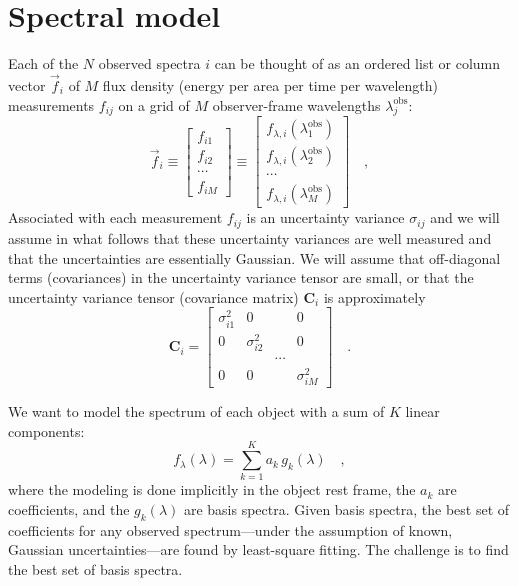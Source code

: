 \documentclass[apj]{emulateapj}
\begin{document}
\section{Spectral model}\label{method}
Each of the $N$ observed spectra $i$ can be thought of as an ordered list or column vector $\vec{f}_i$ of $M$ flux density (energy per area per time
per wavelength) measurements $f_{ij}$ on a grid of $M$ observer-frame wavelengths $\lambda^{\mathrm{obs}}_j$:
\begin{equation}\label{e1}
\vec{f}_i
\equiv \left[\begin{array}{c} f_{i1} \\
                              f_{i2} \\
                              \cdots \\
                              f_{iM} \end{array}\right]
\equiv \left[\begin{array}{c} f_{\lambda,i}(\lambda^{\mathrm{obs}}_1) \\
                              f_{\lambda,i}(\lambda^{\mathrm{obs}}_2) \\
                                                \cdots \\
                              f_{\lambda,i}(\lambda^{\mathrm{obs}}_M) \end{array}\right]
\quad ,
\end{equation}
Associated with each measurement $f_{ij}$ is an uncertainty variance $\sigma_{ij}$ and we will assume in what follows that these uncertainty variances are well measured and that the uncertainties are essentially Gaussian.  We will assume that off-diagonal terms (covariances) in the uncertainty variance tensor are small, or that the uncertainty variance tensor (covariance matrix) $\textbf{C}_i$ is approximately
\begin{equation}\label{e2}
\textbf{C}_i =
 \left[\begin{array}{cccc} \sigma_{i1}^2 & 0 & & 0 \\
                           0 & \sigma_{i2}^2 & & 0 \\
                           & & \cdots & \\
                           0 & 0 & & \sigma_{iM}^2 \end{array}\right]
\quad .
\end{equation}

We want to model the spectrum of each object with a sum of $K$ linear components:
\begin{equation}\label{e3}
f_{\lambda}(\lambda) = \sum_{k=1}^{K} a_k\,g_k(\lambda)
\quad ,
\end{equation}
where the modeling is done implicitly in the object rest frame, the $a_k$ are coefficients, and the $g_k(\lambda)$ are basis spectra.
Given basis spectra, the best set of coefficients for any observed spectrum---under the assumption of known, Gaussian uncertainties---are found by least-square fitting.  The challenge is to find the best set of basis spectra.
\end{document}
